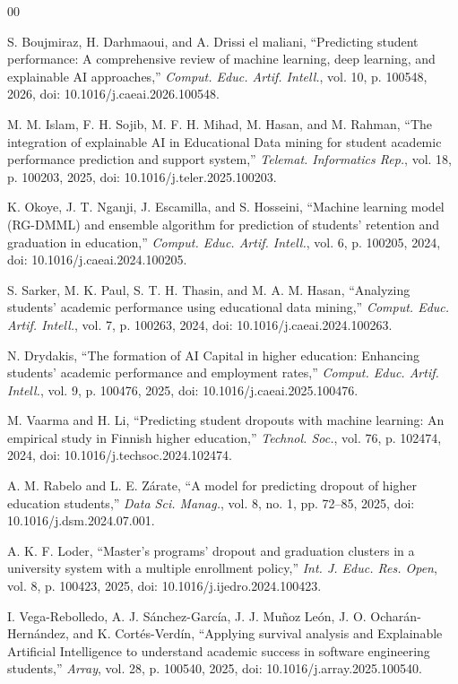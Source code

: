 \documentclass{ieeeaccess}
\begin{document}
\begin{thebibliography}{00}

 S. Boujmiraz, H. Darhmaoui, and A. Drissi el maliani, ``Predicting student performance: A comprehensive review of machine learning, deep learning, and explainable AI approaches,'' \emph{Comput. Educ. Artif. Intell.}, vol. 10, p. 100548, 2026, doi: 10.1016/j.caeai.2026.100548.

 M. M. Islam, F. H. Sojib, M. F. H. Mihad, M. Hasan, and M. Rahman, ``The integration of explainable AI in Educational Data mining for student academic performance prediction and support system,'' \emph{Telemat. Informatics Rep.}, vol. 18, p. 100203, 2025, doi: 10.1016/j.teler.2025.100203.

 K. Okoye, J. T. Nganji, J. Escamilla, and S. Hosseini, ``Machine learning model (RG-DMML) and ensemble algorithm for prediction of students' retention and graduation in education,'' \emph{Comput. Educ. Artif. Intell.}, vol. 6, p. 100205, 2024, doi: 10.1016/j.caeai.2024.100205.

 S. Sarker, M. K. Paul, S. T. H. Thasin, and M. A. M. Hasan, ``Analyzing students' academic performance using educational data mining,'' \emph{Comput. Educ. Artif. Intell.}, vol. 7, p. 100263, 2024, doi: 10.1016/j.caeai.2024.100263.

 N. Drydakis, ``The formation of AI Capital in higher education: Enhancing students' academic performance and employment rates,'' \emph{Comput. Educ. Artif. Intell.}, vol. 9, p. 100476, 2025, doi: 10.1016/j.caeai.2025.100476.

 M. Vaarma and H. Li, ``Predicting student dropouts with machine learning: An empirical study in Finnish higher education,'' \emph{Technol. Soc.}, vol. 76, p. 102474, 2024, doi: 10.1016/j.techsoc.2024.102474.

 A. M. Rabelo and L. E. Z\'{a}rate, ``A model for predicting dropout of higher education students,'' \emph{Data Sci. Manag.}, vol. 8, no. 1, pp. 72--85, 2025, doi: 10.1016/j.dsm.2024.07.001.

 A. K. F. Loder, ``Master's programs' dropout and graduation clusters in a university system with a multiple enrollment policy,'' \emph{Int. J. Educ. Res. Open}, vol. 8, p. 100423, 2025, doi: 10.1016/j.ijedro.2024.100423.

 I. Vega-Rebolledo, A. J. S\'{a}nchez-Garc\'{i}a, J. J. Mu\~{n}oz Le\'{o}n, J. O. Ochar\'{a}n-Hern\'{a}ndez, and K. Cort\'{e}s-Verd\'{i}n, ``Applying survival analysis and Explainable Artificial Intelligence to understand academic success in software engineering students,'' \emph{Array}, vol. 28, p. 100540, 2025, doi: 10.1016/j.array.2025.100540.


\end{thebibliography}
\end{document}
